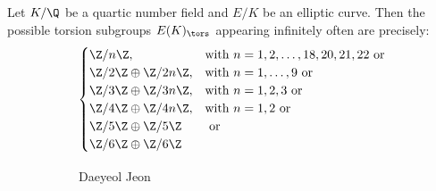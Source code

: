 




\begin{frame}[plain]
\begin{thm}
Let $K/\Q$ be a quartic number field and $E/K$ be an elliptic curve. Then the possible torsion subgroups $E(K)_\tors$ appearing infinitely often are precisely:
	\[
	\begin{cases}
	\Z/n\Z, & \text{with } n=1,2,\ldots,18,20,21,22 \text{ or} \\
	\Z/2\Z \oplus \Z/2n\Z, & \text{with } n=1,\ldots,9 \text{ or} \\
	\Z/3\Z \oplus \Z/3n\Z, & \text{with } n=1,2,3 \text{ or} \\
	\Z/4\Z \oplus \Z/4n\Z, & \text{with } n=1,2 \text{ or} \\
	\Z/5\Z \oplus \Z/5\Z & \text{ or} \\
	\Z/6\Z \oplus \Z/6\Z
	\end{cases}
	\]
\end{thm}
	\begin{figure}[h]
	\centering
	\begin{subfigure}{0.3\textwidth}
	\captionsetup{labelformat=empty}
	\centering
	\caption{\hspace{0.1cm}Daeyeol Jeon}
	\end{subfigure}
	\begin{subfigure}{0.3\textwidth}
	\captionsetup{labelformat=empty}
	\centering

\end{subfigure}
\end{figure}
\end{frame}
